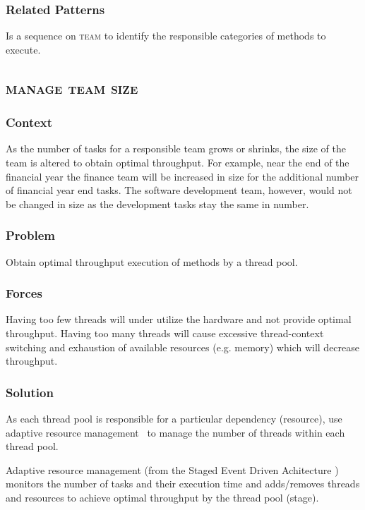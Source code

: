 \documentclass[prodmode]{style/acmlarge}
\begin{document}
\subsubsection*{Related Patterns} Is a sequence on \textsc{team} to identify
the responsible categories of methods to execute.



\subsection{\textsc{\textbf{manage team size}}}

\subsubsection*{Context} As the number of tasks for a responsible team grows or
shrinks, the size of the team is altered to obtain optimal throughput.  For
example, near the end of the financial year the finance team will be increased
in size for the additional number of financial year end tasks.  The software
development team, however, would not be changed in size as the development tasks
stay the same in number.

\subsubsection*{Problem} Obtain optimal throughput execution of methods by a
thread pool.

\subsubsection*{Forces} Having too few threads will under utilize the hardware
and not provide optimal throughput.  Having too many threads will cause
excessive thread-context switching and exhaustion of available resources (e.g.
memory) which will decrease throughput.

\subsubsection*{Solution} As each thread pool is responsible for a particular
dependency (resource), use adaptive resource management~\cite{seda} to manage
the number of threads within each thread pool.

Adaptive resource management (from the Staged Event Driven Achitecture
\cite{seda}) monitors the number of tasks and their execution time and
adds/removes threads and resources to achieve optimal throughput by the thread
pool (stage).
\end{document}
